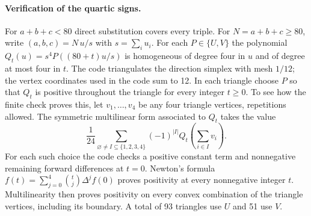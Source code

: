 \documentclass[11pt,a4paper]{article}
\begin{document}
\paragraph{Verification of the quartic signs.}
For $a+b+c<80$ direct substitution covers every triple. For $N=a+b+c\ge80$, write $(a,b,c)=N\,u/s$ with $s=\sum_i u_i$. For each $P\in\{U,V\}$ the polynomial $Q_t(u)=s^4P((80+t)u/s)$ is homogeneous of degree four in $u$ and of degree at most four in $t$. The code triangulates the direction simplex with mesh $1/12$; the vertex coordinates used in the code sum to 12. In each triangle choose $P$ so that $Q_t$ is positive throughout the triangle for every integer $t\ge0$. To see how the finite check proves this, let $v_1,\ldots,v_4$ be any four triangle vertices, repetitions allowed. The symmetric multilinear form associated to $Q_t$ takes the value
\[
 \frac{1}{24}\sum_{\varnothing\ne I\subseteq\{1,2,3,4\}}(-1)^{|I|}
 Q_t\!\left(\sum_{i\in I}v_i\right).
\]
For each such choice the code checks a positive constant term and nonnegative remaining forward differences at $t=0$. Newton's formula $f(t)=\sum_{j=0}^4\binom tj\Delta^jf(0)$ proves positivity at every nonnegative integer $t$. Multilinearity then proves positivity on every convex combination of the triangle vertices, including its boundary. A total of 93 triangles use $U$ and 51 use $V$.
\end{document}

